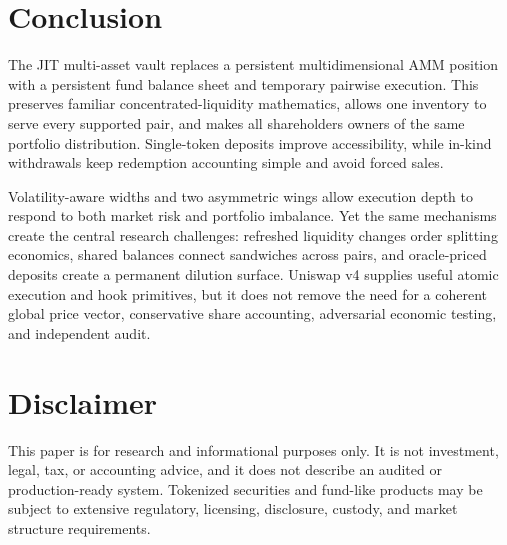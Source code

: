 \documentclass[11pt]{article}
\begin{document}
\section{Conclusion}

The JIT multi-asset vault replaces a persistent multidimensional AMM position
with a persistent fund balance sheet and temporary pairwise execution. This
preserves familiar concentrated-liquidity mathematics, allows one inventory to
serve every supported pair, and makes all shareholders owners of the same
portfolio distribution. Single-token deposits improve accessibility, while
in-kind withdrawals keep redemption accounting simple and avoid forced sales.

Volatility-aware widths and two asymmetric wings allow execution depth to
respond to both market risk and portfolio imbalance. Yet the same mechanisms
create the central research challenges: refreshed liquidity changes order
splitting economics, shared balances connect sandwiches across pairs, and
oracle-priced deposits create a permanent dilution surface. Uniswap v4 supplies
useful atomic execution and hook primitives, but it does not remove the need for
a coherent global price vector, conservative share accounting, adversarial
economic testing, and independent audit.

\section*{Disclaimer}

This paper is for research and informational purposes only. It is not investment,
legal, tax, or accounting advice, and it does not describe an audited or
production-ready system. Tokenized securities and fund-like products may be
subject to extensive regulatory, licensing, disclosure, custody, and market
structure requirements.
\end{document}
